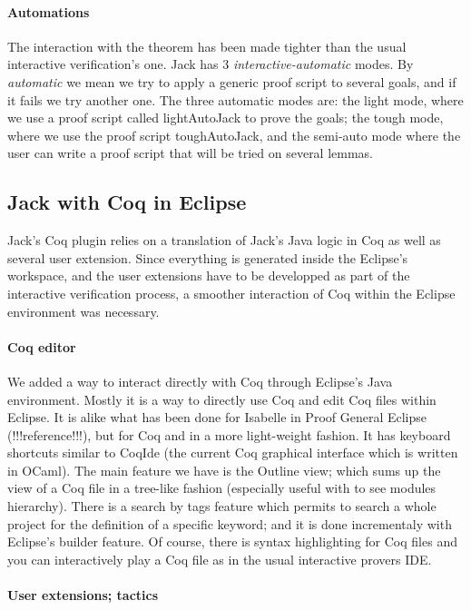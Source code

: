 \paragraph{Automations}
The interaction with the theorem has been made tighter than the usual 
interactive verification's one.
Jack has 3 {\it interactive-automatic} modes. 
By {\it automatic} we mean we 
try to apply a generic proof script to several goals, 
and if it fails we try another one. 
The three automatic modes are: the light mode, where we use a proof script
called lightAutoJack to prove the goals; 
the tough mode, where we use the proof script toughAutoJack, 
and the semi-auto mode where the user can write a proof script that will
be tried on several lemmas.



\subsection{Jack with Coq in Eclipse}
Jack's Coq plugin relies on a translation of Jack's Java logic in
Coq as well as several user extension. Since everything is generated
inside the Eclipse's workspace, and the user extensions have to be 
developped as part of the interactive verification process,
 a smoother interaction of Coq within
the Eclipse environment was necessary.

\paragraph{Coq editor}
We added a way to interact directly with Coq through Eclipse's Java 
environment. Mostly it is a way to directly use Coq and edit Coq files within
Eclipse. It is alike what has been done for Isabelle in Proof General Eclipse 
(!!!reference!!!), but for Coq and in a more light-weight fashion.
It has keyboard shortcuts similar to CoqIde (the current Coq graphical
interface which is written in OCaml). 
The main feature we have is the Outline view; 
which sums up the view of a Coq file in a tree-like fashion (especially useful
with to see modules hierarchy). There is a search by tags feature which
permits to search a whole project for the definition of a specific keyword; and
it is done incrementaly with Eclipse's builder feature. Of course, there is 
syntax highlighting for Coq files and you can interactively play a Coq file
as in the usual interactive provers IDE.


\paragraph{User extensions; tactics}

